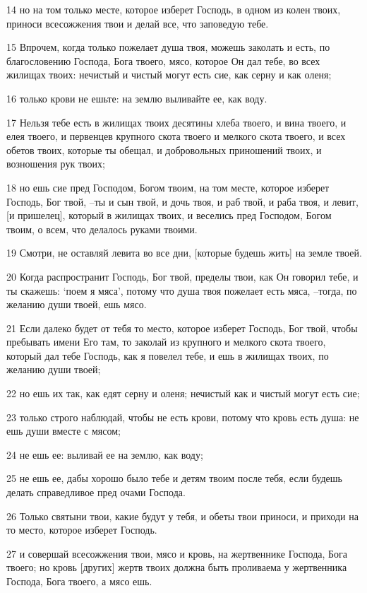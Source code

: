 \par 14 но на том только месте, которое изберет Господь, в одном из колен твоих, приноси всесожжения твои и делай все, что заповедую тебе.
\par 15 Впрочем, когда только пожелает душа твоя, можешь заколать и есть, по благословению Господа, Бога твоего, мясо, которое Он дал тебе, во всех жилищах твоих: нечистый и чистый могут есть сие, как серну и как оленя;
\par 16 только крови не ешьте: на землю выливайте ее, как воду.
\par 17 Нельзя тебе есть в жилищах твоих десятины хлеба твоего, и вина твоего, и елея твоего, и первенцев крупного скота твоего и мелкого скота твоего, и всех обетов твоих, которые ты обещал, и добровольных приношений твоих, и возношения рук твоих;
\par 18 но ешь сие пред Господом, Богом твоим, на том месте, которое изберет Господь, Бог твой, --ты и сын твой, и дочь твоя, и раб твой, и раба твоя, и левит, [и пришелец], который в жилищах твоих, и веселись пред Господом, Богом твоим, о всем, что делалось руками твоими.
\par 19 Смотри, не оставляй левита во все дни, [которые будешь жить] на земле твоей.
\par 20 Когда распространит Господь, Бог твой, пределы твои, как Он говорил тебе, и ты скажешь: `поем я мяса', потому что душа твоя пожелает есть мяса, --тогда, по желанию души твоей, ешь мясо.
\par 21 Если далеко будет от тебя то место, которое изберет Господь, Бог твой, чтобы пребывать имени Его там, то заколай из крупного и мелкого скота твоего, который дал тебе Господь, как я повелел тебе, и ешь в жилищах твоих, по желанию души твоей;
\par 22 но ешь их так, как едят серну и оленя; нечистый как и чистый могут есть сие;
\par 23 только строго наблюдай, чтобы не есть крови, потому что кровь есть душа: не ешь души вместе с мясом;
\par 24 не ешь ее: выливай ее на землю, как воду;
\par 25 не ешь ее, дабы хорошо было тебе и детям твоим после тебя, если будешь делать справедливое пред очами Господа.
\par 26 Только святыни твои, какие будут у тебя, и обеты твои приноси, и приходи на то место, которое изберет Господь.
\par 27 и совершай всесожжения твои, мясо и кровь, на жертвеннике Господа, Бога твоего; но кровь [других] жертв твоих должна быть проливаема у жертвенника Господа, Бога твоего, а мясо ешь.
